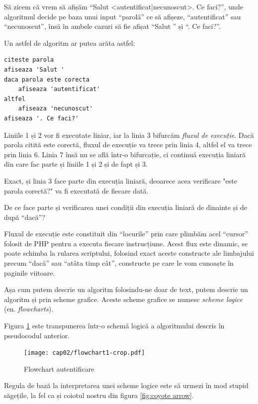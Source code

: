Să zicem că vrem să afișăm ``Salut <autentificat|necunoscut>. Ce faci?'',
unde algoritmul decide pe baza unui input ``parolă'' ce să afișeze, ``autentificat''
sau ``necunoscut'', însă în ambele cazuri să fie afișat ``Salut '' și ``. Ce faci?''.

Un astfel de algoritm ar putea arăta astfel:
\begin{lstlisting}[language=pseudocode]
citeste parola
afiseaza 'Salut '
daca parola este corecta
	afiseaza 'autentificat'
altfel
	afiseaza 'necunoscut'
afiseaza '. Ce faci?'
\end{lstlisting}

Liniile 1 și 2 vor fi executate liniar, iar la linia 3 bifurcăm \textsl{fluxul de execuție}.
Dacă parola citită este corectă, fluxul de execuție va trece prin linia 4, altfel
el va trece prin linia 6. Linia 7 însă nu se află într-o bifurcație, ci continuă
execuția liniară din care fac parte și liniile 1 și 2 și de fapt și 3.

Exact, și linia 3 face parte din execuția liniară, deoarece acea verificare "este
parola corectă?" va fi executată de fiecare dată.

\begin{Exercise}[title={Execuția liniară conține și verificarea condiției},difficulty=1]
De ce face parte și verificarea unei condiții din execuția liniară de dinainte și de după
``dacă''?
\end{Exercise}


Fluxul de execuție este constituit din ``locurile'' prin care plimbăm
acel ``cursor'' folosit de PHP pentru a executa fiecare instrucțiune.
Acest flux este dinamic, se poate schimba la rularea scriptului,
folosind exact aceste constructe ale limbajului precum ``dacă'' sau ``atâta timp cât'',
constructe pe care le vom cunoaște în paginile viitoare.

Așa cum putem descrie un algoritm folosindu-ne doar de text, putem
descrie un algoritm și prin scheme grafice. Aceste scheme grafice se numesc
\textit{scheme logice} (en. \textsl{flowcharts}).

Figura \ref{fig:flowchart authenticated} este transpunerea
într-o schemă logică a algoritmului descris în pseudocodul anterior.

\begin{figure}[ht!]
  \centering
    \texttt{[image: cap02/flowchart1-crop.pdf]}
  \caption{Flowchart autentificare}
  \label{fig:flowchart authenticated}
\end{figure}

Regula de bază la interpretarea unei scheme logice
este să urmezi în mod stupid săgețile, la fel ca și
coiotul nostru din figura \ref{fig:coyote arrow}.

